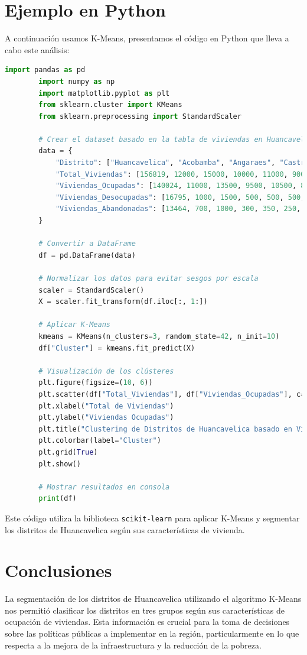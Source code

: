 \documentclass[12pt]{book}
\begin{document}
	\section{Ejemplo en Python}
	A continuación usamos K-Means, presentamos el código en Python que lleva a cabo este análisis:
	
	\begin{lstlisting}[language=Python, caption=Código en Python para aplicar K-Means]
		import pandas as pd
		import numpy as np
		import matplotlib.pyplot as plt
		from sklearn.cluster import KMeans
		from sklearn.preprocessing import StandardScaler
		
		# Crear el dataset basado en la tabla de viviendas en Huancavelica
		data = {
			"Distrito": ["Huancavelica", "Acobamba", "Angaraes", "Castrovirreyna", "Churcampa", "Huaytará", "Tayacaja"],
			"Total_Viviendas": [156819, 12000, 15000, 10000, 11000, 9000, 18000],
			"Viviendas_Ocupadas": [140024, 11000, 13500, 9500, 10500, 8500, 16500],
			"Viviendas_Desocupadas": [16795, 1000, 1500, 500, 500, 500, 1500],
			"Viviendas_Abandonadas": [13464, 700, 1000, 300, 350, 250, 1000]
		}
		
		# Convertir a DataFrame
		df = pd.DataFrame(data)
		
		# Normalizar los datos para evitar sesgos por escala
		scaler = StandardScaler()
		X = scaler.fit_transform(df.iloc[:, 1:])
		
		# Aplicar K-Means
		kmeans = KMeans(n_clusters=3, random_state=42, n_init=10)
		df["Cluster"] = kmeans.fit_predict(X)
		
		# Visualización de los clústeres
		plt.figure(figsize=(10, 6))
		plt.scatter(df["Total_Viviendas"], df["Viviendas_Ocupadas"], c=df["Cluster"], cmap='viridis', s=100, edgecolors='k')
		plt.xlabel("Total de Viviendas")
		plt.ylabel("Viviendas Ocupadas")
		plt.title("Clustering de Distritos de Huancavelica basado en Viviendas")
		plt.colorbar(label="Cluster")
		plt.grid(True)
		plt.show()
		
		# Mostrar resultados en consola
		print(df)
	\end{lstlisting}
	
	Este código utiliza la biblioteca \texttt{scikit-learn} para aplicar K-Means y segmentar los distritos de Huancavelica según sus características de vivienda.
	
	
	\section{Conclusiones}
	La segmentación de los distritos de Huancavelica utilizando el algoritmo K-Means nos permitió clasificar los distritos en tres grupos según sus características de ocupación de viviendas. Esta información es crucial para la toma de decisiones sobre las políticas públicas a implementar en la región, particularmente en lo que respecta a la mejora de la infraestructura y la reducción de la pobreza.
	
\end{document}
